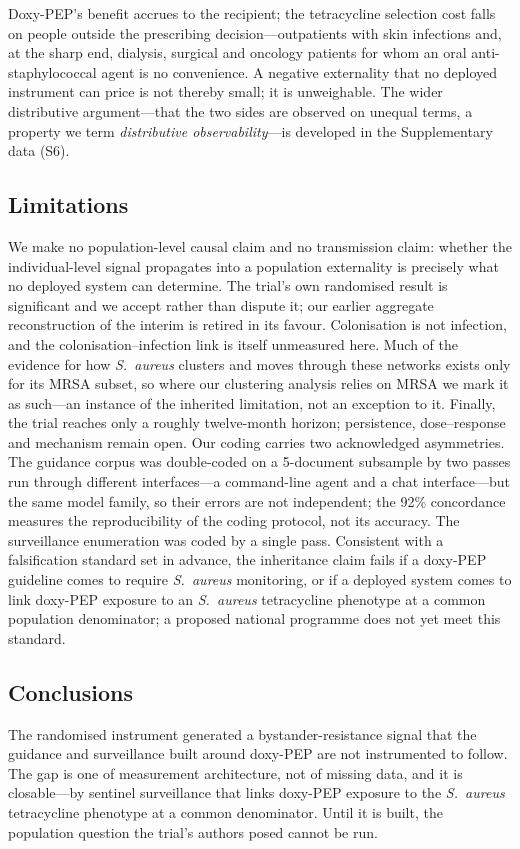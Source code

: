 \documentclass[12pt,a4paper]{article}
\newcommand{\sa}{\emph{S.~aureus}}
\begin{document}
Doxy-PEP's benefit accrues to the recipient; the tetracycline selection cost
falls on people outside the prescribing decision---outpatients with skin
infections and, at the sharp end, dialysis, surgical and oncology patients for whom
an oral anti-staphylococcal agent is no convenience. A negative externality that
no deployed instrument can price is not thereby small; it is unweighable. The
wider distributive argument---that the two sides are observed on unequal terms, a
property we term \emph{distributive observability}---is developed in the
Supplementary data (S6).\cite{montoya2025affected}

\subsection*{Limitations}
We make no population-level causal claim and no transmission claim: whether the
individual-level signal propagates into a population externality is precisely what
no deployed system can determine. The trial's own randomised result is
significant and we accept rather than dispute it; our earlier aggregate
reconstruction of the interim is retired in its favour. Colonisation is not
infection, and the colonisation--infection link is itself unmeasured here. Much of
the evidence for how \sa{} clusters and moves through these networks exists only
for its MRSA subset, so where our clustering analysis relies on MRSA we mark it as
such---an instance of the inherited limitation, not an exception to it. Finally,
the trial reaches only a roughly twelve-month horizon; persistence, dose--response
and mechanism remain open. Our coding carries two acknowledged asymmetries. The guidance corpus was
double-coded on a 5-document subsample by two passes run through different
interfaces---a command-line agent and a chat interface---but the same model
family, so their errors are not independent; the 92\% concordance measures the
reproducibility of the coding protocol, not its accuracy. The surveillance
enumeration was coded by a single pass. Consistent with a
falsification standard set in advance, the inheritance claim fails if a doxy-PEP
guideline comes to require
\sa{} monitoring, or if a deployed system comes to link doxy-PEP exposure to an
\sa{} tetracycline phenotype at a common population denominator; a proposed
national programme does not yet meet this standard.\cite{ukhsa2026}

\subsection*{Conclusions}
The randomised instrument generated a bystander-resistance signal that the
guidance and surveillance built around doxy-PEP are not instrumented to follow.
The gap is one of measurement architecture, not of missing data, and it is
closable---by sentinel surveillance that links doxy-PEP exposure to the \sa{}
tetracycline phenotype at a common denominator. Until it is built, the population
question the trial's authors posed cannot be run.
\end{document}
